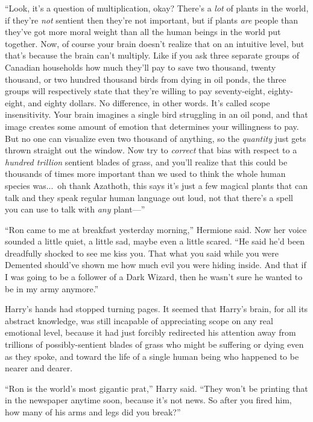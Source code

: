 “Look, it’s a question of multiplication, okay? There’s a \emph{lot} of plants in the world, if they’re \emph{not} sentient then they’re not important, but if plants \emph{are} people than they’ve got more moral weight than all the human beings in the world put together. Now, of course your brain doesn’t realize that on an intuitive level, but that’s because the brain can’t multiply. Like if you ask three separate groups of Canadian households how much they’ll pay to save two thousand, twenty thousand, or two hundred thousand birds from dying in oil ponds, the three groups will respectively state that they’re willing to pay seventy-eight, eighty-eight, and eighty dollars. No difference, in other words. It’s called scope insensitivity. Your brain imagines a single bird struggling in an oil pond, and that image creates some amount of emotion that determines your willingness to pay. But no one can visualize even two thousand of anything, so the \emph{quantity} just gets thrown straight out the window. Now try to \emph{correct} that bias with respect to a \emph{hundred trillion} sentient blades of grass, and you’ll realize that this could be thousands of times more important than we used to think the whole human species was...\ oh thank Azathoth, this says it’s just a few magical plants that can talk and they speak regular human language out loud, not that there’s a spell you can use to talk with \emph{any} plant—”

“Ron came to me at breakfast yesterday morning,” Hermione said. Now her voice sounded a little quiet, a little sad, maybe even a little scared. “He said he’d been dreadfully shocked to see me kiss you. That what you said while you were Demented should’ve shown me how much evil you were hiding inside. And that if I was going to be a follower of a Dark Wizard, then he wasn’t sure he wanted to be in my army anymore.”

Harry’s hands had stopped turning pages. It seemed that Harry’s brain, for all its abstract knowledge, was still incapable of appreciating scope on any real emotional level, because it had just forcibly redirected his attention away from trillions of possibly-sentient blades of grass who might be suffering or dying even as they spoke, and toward the life of a single human being who happened to be nearer and dearer.

“Ron is the world’s most gigantic prat,” Harry said. “They won’t be printing that in the newspaper anytime soon, because it’s not news. So after you fired him, how many of his arms and legs did you break?”

